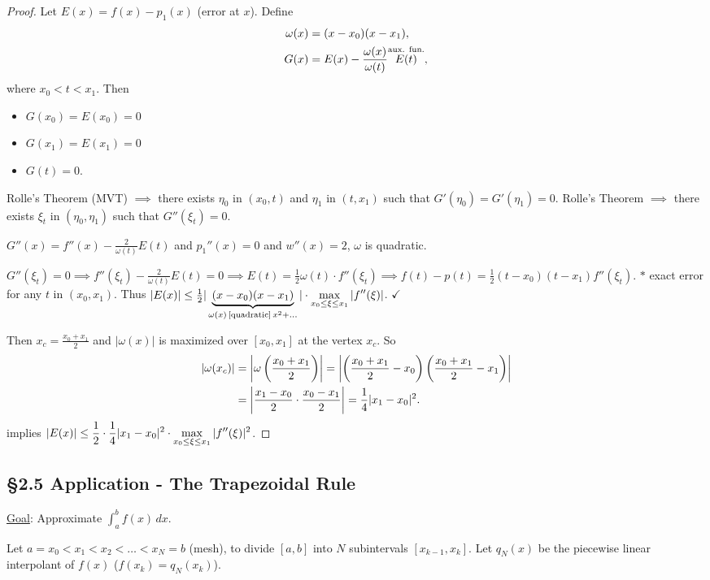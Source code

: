 \documentclass[]{article}
\begin{document}
\begin{proof}
	Let $E(x) = f(x)-p_1(x)$ (error at $x$).
	Define
	\begin{align*}
		\omega(x) &= (x-x_0)(x-x_1), \\
		G(x) &= E(x)-\frac{\omega(x)}{\omega(t)}\os{\text{aux. fun.}}{E(t)},
	\end{align*}
	where $x_0<t<x_1$.
	Then
	\begin{itemize}
		\item $G(x_0)=E(x_0)=0$
		\item $G(x_1)=E(x_1)=0$
		\item $G(t) = 0$.
	\end{itemize}
	Rolle's Theorem (MVT) $\implies$ there exists $\eta_0$ in $(x_0,t)$ and $\eta_1$ in $(t,x_1)$ such that $G'(\eta_0)=G'(\eta_1)=0$.
	Rolle's Theorem $\implies$ there exists $\xi_t$ in $(\eta_0,\eta_1)$ such that $G''(\xi_t)=0$.
	\begin{note}
		$G''(x) = f''(x) - \frac2{\omega(t)}E(t)$ and $p_1''(x)=0$ and $w''(x)=2$, $\omega$ is quadratic.
	\end{note}
	$G''(\xi_t)=0 \implies f''(\xi_t)-\frac2{\omega(t)}E(t)=0 \implies E(t) = \frac12\omega(t)\cdot f''(\xi_t) \implies f(t)-p(t) = \frac12(t-x_0)(t-x_1)f''(\xi_t)$.
	$*$ exact error for any $t$ in $(x_0,x_1)$.
	Thus $|E(x)| \leq \frac12 |\ub{\omega(x)\,\text{[quadratic]}\,x^2+\dots}{(x-x_0)(x-x_1)}|\cdot\ds\max_{x_0\leq\xi\leq x_1}|f''(\xi)|$. $\checkmark$
	
	Then $x_c = \frac{x_0+x_1}2$ and $|\omega(x)|$ is maximized over $[x_0,x_1]$ at the vertex $x_c$.
	So
	\begin{align*}
		|\omega(x_c)| &= \mlr{\omega\plr{\frac{x_0+x_1}2}}
					  = \mlr{\plr{\frac{x_0+x_1}2-x_0}\plr{\frac{x_0+x_1}2-x_1}} \\
					  &= \mlr{\frac{x_1-x_0}2\cdot\frac{x_0-x_1}2}
					  = \frac14|x_1-x_0|^2.
	\end{align*}
	implies $\ds |E(x)| \leq \frac12\cdot\frac14|x_1-x_0|^2\cdot\max_{x_0\leq\xi\leq x_1}|f''(\xi)|^2$.
\end{proof}

\subsection*{\S2.5 Application - The Trapezoidal Rule}

\ul{Goal}: Approximate $\int_a^bf(x)\,dx$.

Let $a=x_0<x_1<x_2<\dots<x_N=b$ (mesh), to divide $[a,b]$ into $N$ subintervals $[x_{k-1},x_k]$. Let $q_N(x)$ be the piecewise linear interpolant of $f(x)$ ($f(x_k)=q_N(x_k)$).
\end{document}
